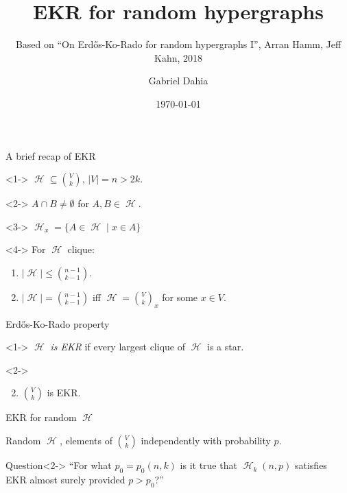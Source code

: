 \documentclass{beamer}
\title{EKR for random hypergraphs}
\subtitle{Based on ``On Erd\H{o}s-Ko-Rado for random hypergraphs I'', Arran Hamm, Jeff
  Kahn, 2018}
\author{Gabriel Dahia}
\institute{IMPA}
\date{\today}
\DeclareMathOperator{\Hy}{\mathcal{H}}
\newcommand{\V}[1]{{V \choose #1}}
\begin{document}
\begin{frame}
  \titlepage
\end{frame}

\begin{frame}{A brief recap of EKR}
  \begin{definition}<1->
    $\Hy \subseteq \V{k}$, $|V| = n > 2k$.
  \end{definition}

  \begin{definition}<2->
    $A \cap B \neq \emptyset$ for $A, B \in \Hy$.
  \end{definition}

  \begin{definition}[Star]<3->
    $\Hy_x = \{A \in \Hy \mid x \in A\}$
  \end{definition}

  \begin{theorem}<4->
    For $\Hy$ clique:
    \begin{enumerate}
      \item $|\Hy| \le {n - 1 \choose k - 1}$.
      \item<5-> $|\Hy| = {n - 1 \choose k - 1}$ iff $\Hy =
              \V{k}_x$ for some $x \in V$.
    \end{enumerate}
  \end{theorem}

\end{frame}

\begin{frame}{Erd\H{o}s-Ko-Rado property}

  \begin{definition}<1->
    $\Hy$ \emph{is EKR} if every largest clique of $\Hy$ is a star.
  \end{definition}

  \begin{theorem}<2->
    \begin{enumerate}
      \setcounter{enumi}{1}
      \item $\V{k}$ is EKR.
    \end{enumerate}
  \end{theorem}

\end{frame}

\begin{frame}{EKR for random $\Hy$}
  \begin{definition}[$\Hy_k(n, p)$]
    Random $\Hy$, elements of $\V{k}$ independently with probability $p$.
  \end{definition}
  \begin{block}{Question}<2->
    ``For what $p_0 = p_0(n,k)$ is it true that $\Hy_k(n, p)$ satisfies EKR almost surely
    provided $p > p_0$?''
  \end{block}
\end{frame}
\end{document}

